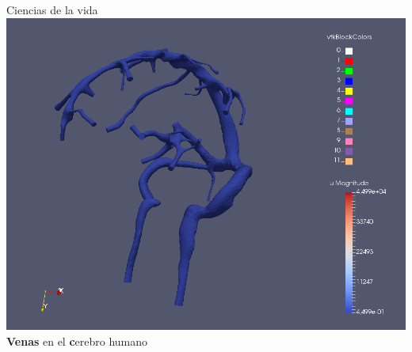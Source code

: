\documentclass[
  unknownkeysallowed %
]{beamer}
\begin{document}
\begin{frame}{Ciencias de la vida}
  \includegraphics[width=0.8\linewidth]{img/brain}
  \\
  \textbf{Venas} en el \alert{\textbf cerebro humano}
\end{frame}
\end{document}

